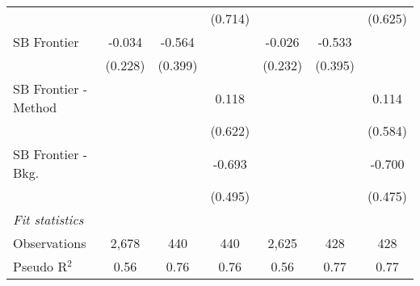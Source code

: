 \begin{tabular}{lcccccc}
                        &         &                & (0.714)        &         &                & (0.625)\\   
   SB Frontier          & -0.034  & -0.564         &                & -0.026  & -0.533         &   \\   
                        & (0.228) & (0.399)        &                & (0.232) & (0.395)        &   \\   
   SB Frontier - Method &         &                & 0.118          &         &                & 0.114\\   
                        &         &                & (0.622)        &         &                & (0.584)\\   
   SB Frontier - Bkg.   &         &                & -0.693         &         &                & -0.700\\   
                        &         &                & (0.495)        &         &                & (0.475)\\   
   \midrule
   \emph{Fit statistics}\\
   Observations         & 2,678   & 440            & 440            & 2,625   & 428            & 428\\  
   Pseudo R$^2$         & 0.56    & 0.76           & 0.76           & 0.56    & 0.77           & 0.77\\  
   

\end{tabular}
